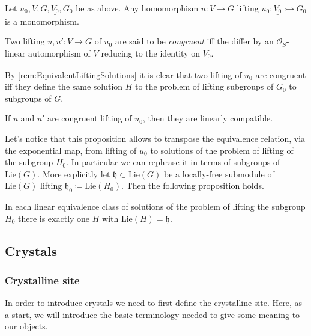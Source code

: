 \documentclass[../Main]{subfiles}
\begin{document}
\begin{lem}
	Let $u_0, \underline{V}, G, \underline{V_0}, G_0$ be as above.
	Any homomorphism $u\colon \underline{V} \to G$ lifting 
	$u_0\colon \underline{V_0} \rightarrowtail G_0$
	is a monomorphism.
\end{lem} 


\begin{defn}
	Two lifting $u, u'\colon \underline{V} \to G$ of $u_0$ are said to
	be {\em congruent} iff the differ by an $\mathcal{O}_{ S }$-linear
	automorphism of $\underline{V}$ reducing to the identity on $\underline{V_0}$.
\end{defn}


\begin{rem}[]
	By \cref{rem:EquivalentLiftingSolutions} it is clear that
	two lifting of $u_0$ are congruent iff they define the same solution
	$H$ to the problem of lifting subgroups of $G_0$ to subgroups of $G$.
\end{rem}


\begin{lem}
	If $u$ and $u'$ are congruent lifting of $u_0$, then
	they are linearly compatible.
\end{lem} 


\begin{rem}[]
	Let's notice that this proposition allows to
	transpose the equivalence relation, via the exponential map,
	from lifting of $u_0$ to solutions of the problem of lifting
	of the subgroup $H_0$.
	In particular we can rephrase it in terms of subgroups
	of $\mathrm{Lie}(G)$. More explicitly
	let $\mathfrak{h} \subset \mathrm{Lie}(G)$ be a locally-free
	submodule of $\mathrm{Lie}(G)$ lifting
	$\mathfrak{h}_0 \coloneqq \mathrm{Lie}(H_0)$.
	Then the following proposition holds.
\end{rem}


\begin{prop}
	In each linear equivalence class of solutions of
	the problem of lifting the subgroup $H_0$
	there is exactly one $H$ with 
	$\mathrm{Lie}(H) = \mathfrak{h}$.
\end{prop}



\subsection{Crystals}
\subsubsection{Crystalline site}
In order to introduce crystals we need to first define the crystalline site.
Here, as a start, we will introduce the basic terminology needed to give
some meaning to our objects.
\end{document}
